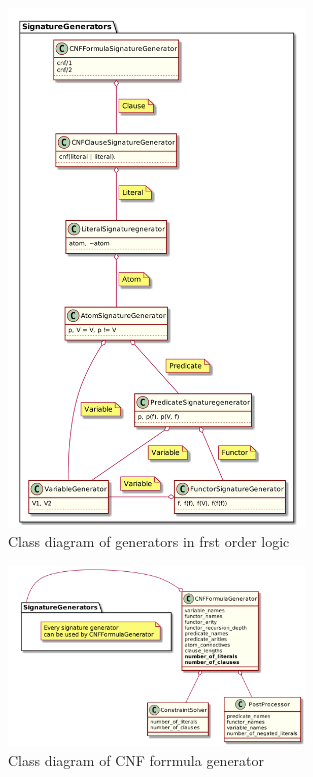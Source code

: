 \begin{figure}[H]
\begin{centering}
  \includegraphics[width=0.7\textwidth]{logic-formula-generator/fol/cnf_signature_generators.png}
  \caption{Class diagram of generators in frst order logic}
\end{centering}
\end{figure}

\begin{figure}[H]
\begin{centering}
  \includegraphics[width=0.7\textwidth]{logic-formula-generator/cnf_formula_generator.png}
  \caption{Class diagram of CNF forrmula generator}
\end{centering}
\end{figure}

